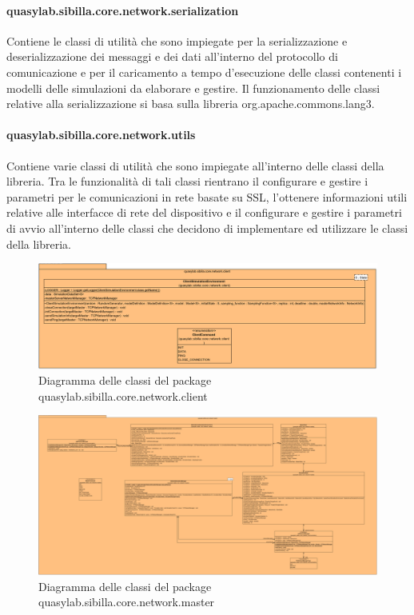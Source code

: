 \paragraph{quasylab.sibilla.core.network.serialization} Contiene le classi di utilità che sono impiegate per la serializzazione e deserializzazione dei messaggi e dei dati all’interno del protocollo di comunicazione e per il caricamento a tempo d’esecuzione delle classi contenenti i modelli delle simulazioni da elaborare e gestire. Il funzionamento delle classi relative alla serializzazione si basa sulla libreria org.apache.commons.lang3.

\paragraph{quasylab.sibilla.core.network.utils} Contiene varie classi di utilità che sono impiegate all’interno delle classi della libreria. Tra le funzionalità di tali classi rientrano il configurare e gestire i parametri per le comunicazioni in rete basate su SSL, l’ottenere informazioni utili relative alle interfacce di rete del dispositivo e il configurare e gestire i parametri di avvio all’interno delle classi che decidono di implementare ed utilizzare le classi della libreria.

\begin{figure}[h!]
  \includegraphics[width=\linewidth]{images/quasylab.sibilla.core.network.client.png}
  \captionsetup{justification=centering}
  \caption{Diagramma delle classi del package quasylab.sibilla.core.network.client}
\end{figure}

\begin{figure}[h!]
  \includegraphics[width=\linewidth]{images/quasylab.sibilla.core.network.master.png}
  \captionsetup{justification=centering}
  \caption{Diagramma delle classi del package quasylab.sibilla.core.network.master}
\end{figure}

